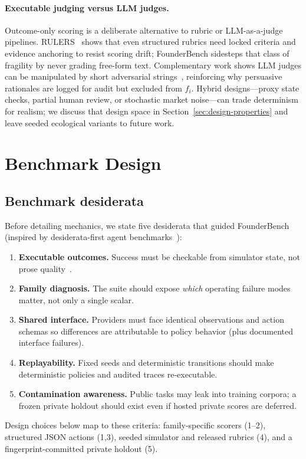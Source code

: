 \documentclass[sigconf,review]{acmart}
\begin{document}
\paragraph{Executable judging versus LLM judges.}
Outcome-only scoring is a deliberate alternative to rubric or LLM-as-a-judge pipelines.
RULERS~\cite{hong2026rulers} shows that even structured rubrics need locked criteria and evidence anchoring to resist scoring drift; FounderBench sidesteps that class of fragility by never grading free-form text.
Complementary work shows LLM judges can be manipulated by short adversarial strings~\cite{zhao2025onetoken}, reinforcing why persuasive rationales are logged for audit but excluded from $f_i$.
Hybrid designs---proxy state checks, partial human review, or stochastic market noise---can trade determinism for realism; we discuss that design space in Section~\ref{sec:design-properties} and leave seeded ecological variants to future work.

\section{Benchmark Design}
\subsection{Benchmark desiderata}
\label{sec:desiderata}
Before detailing mechanics, we state five desiderata that guided FounderBench (inspired by desiderata-first agent benchmarks~\cite{xu2025theagentcompany,zhou2024webarena}):
\begin{enumerate}
  \item \textbf{Executable outcomes.} Success must be checkable from simulator state, not prose quality~\cite{jimenez2024swebench,zhou2024webarena,mialon2023gaia}.
  \item \textbf{Family diagnosis.} The suite should expose \emph{which} operating failure modes matter, not only a single scalar.
  \item \textbf{Shared interface.} Providers must face identical observations and action schemas so differences are attributable to policy behavior (plus documented interface failures).
  \item \textbf{Replayability.} Fixed seeds and deterministic transitions should make deterministic policies and audited traces re-executable.
  \item \textbf{Contamination awareness.} Public tasks may leak into training corpora; a frozen private holdout should exist even if hosted private scores are deferred.
\end{enumerate}
Design choices below map to these criteria: family-specific scorers (1--2), structured JSON actions (1,3), seeded simulator and released rubrics (4), and a fingerprint-committed private holdout (5).
\end{document}
